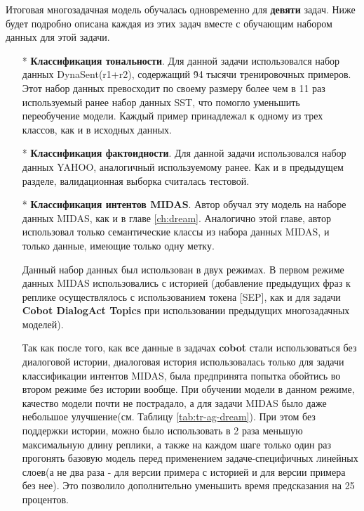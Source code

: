 Итоговая многозадачная модель обучалась одновременно для \textbf{девяти} задач. Ниже будет подробно описана каждая из этих задач вместе с обучающим набором данных для этой задачи. 
\begin{itemize} 
\item[*]\textbf{Классификация тональности}. Для данной задачи использовался набор данных DynaSent(r1+r2)\cite{dynasent}, содержащий \~ 94 тысячи тренировочных примеров. Этот набор данных превосходит по своему размеру более чем в 11 раз используемый ранее набор данных SST\cite{sst}, что помогло уменьшить переобучение модели. Каждый пример принадлежал к одному из трех классов, как и в исходных данных. 

\item[*]\textbf{Классификация фактоидности}. Для данной задачи использовался набор данных YAHOO\cite{yahoo}, аналогичный используемому ранее. Как и в предыдущем разделе, валидационная выборка считалась тестовой. 

\item[*]\textbf{Классификация интентов MIDAS}. Автор обучал эту модель на наборе данных MIDAS, как и в главе \ref{ch:dream}. Аналогично этой главе, автор использовал только семантические классы из набора данных MIDAS, и только данные, имеющие только одну метку. 

Данный набор данных был использован в двух режимах. В первом режиме данных MIDAS использовались с историей (добавление предыдущих фраз к реплике осуществлялось с использованием токена [SEP], как и для задачи \textbf{Cobot DialogAct Topics} при использовании предыдущих многозадачных моделей).

Так как после того, как все данные в задачах \textbf{cobot} стали использоваться без диалоговой истории, диалоговая история использовалась только для задачи классификации интентов MIDAS, была предпринята попытка обойтись во втором режиме без истории вообще. При обучении модели в данном режиме, качество модели почти не пострадало, а для задачи MIDAS было даже небольшое улучшение(см. Таблицу \ref{tab:tr-ag-dream}). При этом без поддержки истории, можно было использовать в 2 раза меньшую максимальную длину реплики, а также на каждом шаге только один раз прогонять базовую модель перед применением задаче-специфичных линейных слоев(а не два раза - для версии примера с историей и для версии примера без нее). Это позволило дополнительно уменьшить время предсказания на 25 процентов. 


\end{itemize}
